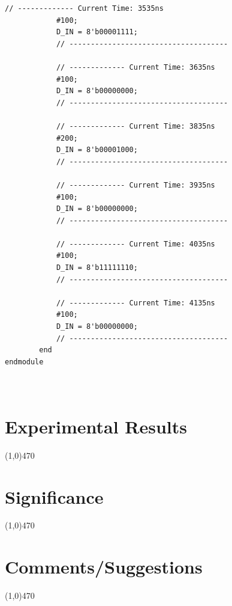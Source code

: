 \documentclass[12pt]{article}
\begin{document}
\begin{Verbatim}[frame=single, fontsize= \small]
			// ------------- Current Time: 3535ns 
			#100;
			D_IN = 8'b00001111;
			// -------------------------------------
			
			// ------------- Current Time: 3635ns 
			#100;
			D_IN = 8'b00000000;
			// -------------------------------------
			
			// ------------- Current Time: 3835ns 
			#200;
			D_IN = 8'b00001000;
			// -------------------------------------
			
			// ------------- Current Time: 3935ns 
			#100;
			D_IN = 8'b00000000;
			// -------------------------------------
			
			// ------------- Current Time: 4035ns 
			#100;
			D_IN = 8'b11111110;
			// -------------------------------------
			
			// ------------- Current Time: 4135ns 
			#100;
			D_IN = 8'b00000000;
			// -------------------------------------
		end 
endmodule

	
		\end{Verbatim}
		
			
\section{Experimental Results}\vspace{-.7cm} \line(1,0){470}

\begin{figure}[h]
    \centering
	\caption{}
\end{figure}

\begin{figure}[h]
    \centering
	\caption{}
\end{figure}

\begin{figure}[h]
    \centering
	\caption{}
\end{figure}

	\newpage
\section{Significance} \vspace{-.7cm} \line(1,0){470}
	\paragraph{} 


 \section{Comments/Suggestions}\vspace{-.7cm} \line(1,0){470}
 	\paragraph{} 
		
\end{document}
